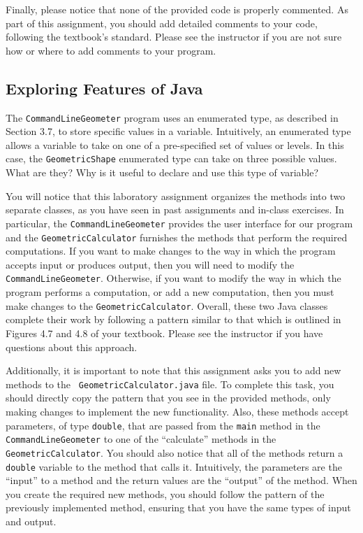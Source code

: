Finally, please notice that none of the provided code is properly commented.  As part of this assignment, you should add
detailed comments to your code, following the textbook's standard. Please see the instructor if you are
not sure how or where to add comments to your program.

\vspace*{-.1in}
\subsection*{Exploring Features of Java}

The {\tt CommandLineGeometer} program uses an enumerated type, as described in Section 3.7, to store specific values in
a variable.  Intuitively, an enumerated type allows a variable to take on one of a pre-specified set of values or
levels.  In this case, the {\tt GeometricShape} enumerated type can take on three possible values.  What are they? Why
is it useful to declare and use this type of variable?

You will notice that this laboratory assignment organizes the methods into two separate classes, as you have seen in
past assignments and in-class exercises. In particular, the {\tt CommandLineGeometer} provides the user interface for
our program and the {\tt GeometricCalculator} furnishes the methods that perform the required computations.  If you want
to make changes to the way in which the program accepts input or produces output, then you will need to modify the {\tt
CommandLineGeometer}. Otherwise, if you want to modify the way in which the program performs a computation, or add a
new computation, then you must make changes to the {\tt GeometricCalculator}. Overall, these two Java classes complete
their work by following a pattern similar to that which is outlined in Figures 4.7 and 4.8 of your textbook. Please see
the instructor if you have questions about this approach.

Additionally, it is important to note that this assignment asks you to add new methods to the {\tt
GeometricCalculator.java} file.  To complete this task, you should directly copy the pattern that you see in the
provided methods, only making changes to implement the new functionality.  Also, these methods accept parameters, of
type {\tt double}, that are passed from the {\tt main} method in the {\tt CommandLineGeometer} to one of the
``calculate'' methods in the {\tt GeometricCalculator}. You should also notice that all of the methods return a {\tt
double} variable to the method that calls it.  Intuitively, the parameters are the ``input'' to a method and the return
values are the ``output'' of the method.  When you create the required new methods, you should follow the pattern of the
previously implemented method, ensuring that you have the same types of input and output.

